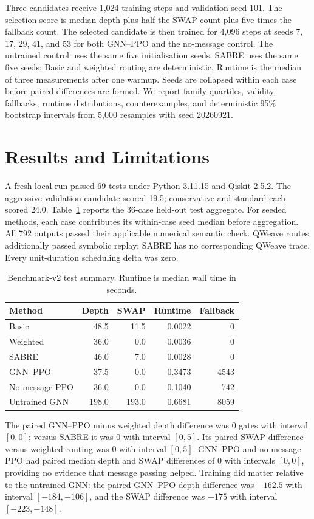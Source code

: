 \documentclass[a4paper,10pt,twocolumn]{article}
\begin{document}
Three candidates receive 1,024 training steps and validation seed 101. The
selection score is median depth plus half the SWAP count plus five times the
fallback count. The selected candidate is then trained for 4,096 steps at
seeds 7, 17, 29, 41, and 53 for both GNN--PPO and the no-message control.
The untrained control uses the same five initialisation seeds. SABRE uses the
same five seeds; Basic and weighted routing are deterministic. Runtime is the
median of three measurements after one warmup. Seeds are collapsed within
each case before paired differences are formed. We report family quartiles,
validity, fallbacks, runtime distributions, counterexamples, and deterministic
95\% bootstrap intervals from 5,000 resamples with seed 20260921.

\section{Results and Limitations}
A fresh local run passed 69 tests under Python 3.11.15 and Qiskit 2.5.2. The
aggressive validation candidate scored 19.5; conservative and standard each
scored 24.0. Table~\ref{tab:test-results} reports the 36-case held-out test
aggregate. For seeded methods, each case contributes its within-case seed
median before aggregation. All 792 outputs passed their applicable numerical
semantic check. QWeave routes additionally passed symbolic replay; SABRE has
no corresponding QWeave trace. Every unit-duration scheduling delta was zero.

\begin{table}[t]
\centering
\caption{Benchmark-v2 test summary. Runtime is median wall time in seconds.}
\label{tab:test-results}
\small
\begin{tabular}{lrrrr}
\toprule
Method & Depth & SWAP & Runtime & Fallback \\
\midrule
Basic & 48.5 & 11.5 & 0.0022 & 0 \\
Weighted & 36.0 & 0.0 & 0.0036 & 0 \\
SABRE & 46.0 & 7.0 & 0.0028 & 0 \\
GNN--PPO & 37.5 & 0.0 & 0.3473 & 4543 \\
No-message PPO & 36.0 & 0.0 & 0.1040 & 742 \\
Untrained GNN & 198.0 & 193.0 & 0.6681 & 8059 \\
\bottomrule
\end{tabular}
\end{table}

The paired GNN--PPO minus weighted depth difference was 0 gates with interval
$[0,0]$; versus SABRE it was 0 with interval $[0,5]$. Its paired SWAP
difference versus weighted routing was 0 with interval $[0,5]$. GNN--PPO and
no-message PPO had paired median depth and SWAP differences of 0 with intervals
$[0,0]$, providing no evidence that message passing helped. Training did
matter relative to the untrained GNN: the paired GNN--PPO depth difference was
$-162.5$ with interval $[-184,-106]$, and the SWAP difference was $-175$ with
interval $[-223,-148]$.
\end{document}
